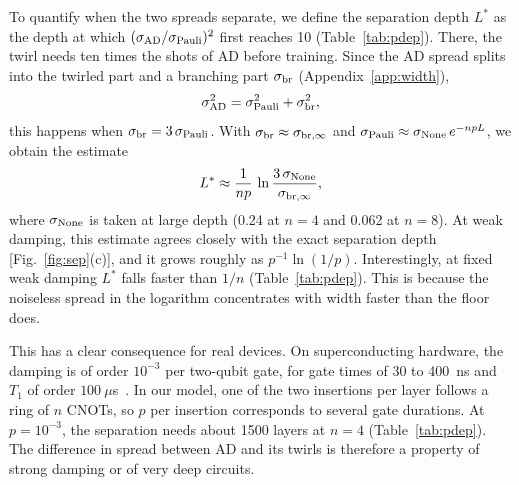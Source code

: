 \documentclass[
 aps,pra,
 twocolumn,
 superscriptaddress,
 longbibliography,
 nofootinbib
]{revtex4-2}
\newcommand{\AD}{\mathrm{AD}}
\begin{document}
To quantify when the two spreads separate, we define the separation depth
$L^*$ as the depth at which $(\sigma_{\AD}/\sigma_{\rm Pauli})^2$ first
reaches 10 (Table~\ref{tab:pdep}). There, the twirl needs ten times the shots
of AD before training. Since the AD spread splits into the twirled part
and a branching part $\sigma_{\rm br}$ (Appendix~\ref{app:width}),
\begin{equation}
\sigma_{\AD}^2=\sigma_{\rm Pauli}^2+\sigma_{\rm br}^2 ,
\label{eq:split}
\end{equation}
this happens when $\sigma_{\rm br}=3\,\sigma_{\rm Pauli}$. With
$\sigma_{\rm br}\approx\sigma_{\rm br,\infty}$ and
$\sigma_{\rm Pauli}\approx\sigma_{\rm None}\,e^{-npL}$, we obtain the estimate
\begin{equation}
L^*\approx\frac{1}{np}\,\ln\frac{3\,\sigma_{\rm None}}{\sigma_{\rm br,\infty}},
\label{eq:Lstar}
\end{equation}
where $\sigma_{\rm None}$ is taken at large depth (0.24 at $n=4$ and 0.062 at
$n=8$). At weak damping, this estimate agrees closely with the exact separation
depth [Fig.~\ref{fig:sep}(c)], and it grows
roughly as $p^{-1}\ln(1/p)$. Interestingly, at fixed weak damping $L^*$ falls
faster than $1/n$ (Table~\ref{tab:pdep}). This is because the noiseless spread
in the logarithm concentrates with width faster than the floor does.

This has a clear consequence for real devices. On superconducting hardware,
the damping
is of order $10^{-3}$ per two-qubit gate, for gate times of 30 to 400~ns and
$T_1$ of order $100~\mu$s~\cite{krantz2019quantum}. In our model, one of the
two insertions per layer follows a ring of $n$ CNOTs, so $p$ per insertion
corresponds to several gate durations. At $p=10^{-3}$, the separation needs
about 1500 layers at $n=4$ (Table~\ref{tab:pdep}). The difference in
spread between AD and its twirls is therefore a property of strong damping or
of very deep circuits.
\end{document}
